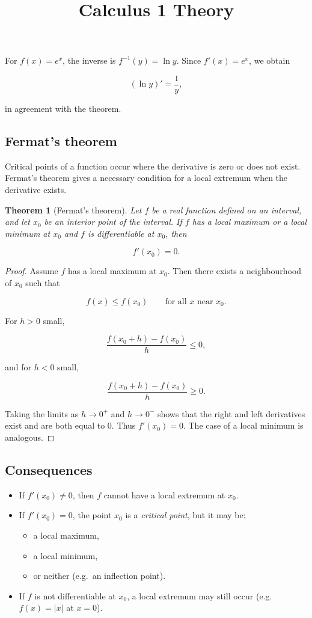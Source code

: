\documentclass[11pt,a4paper]{article} \usepackage[T1]{fontenc}
\theoremstyle{plain} \newtheorem{theorem}{Theorem} \title{Calculus 1 Theory}
\begin{document}
For $f(x)=e^x$, the inverse is $f^{-1}(y)=\ln y$. Since $f'(x)=e^x$, we obtain

\[
(\ln y)' = \frac{1}{y},
\]

in agreement with the theorem.

\subsection {Fermat's theorem}

Critical points of a function occur where the derivative is zero or does not
exist. Fermat's theorem gives a necessary condition for a local extremum when
the derivative exists.

\begin{theorem}
[Fermat's theorem] Let $f$ be a real function defined on an interval, and let
$x_0$ be an interior point of the interval. If $f$ has a local maximum or a
local minimum at $x_0$ and $f$ is differentiable at $x_0$, then

\[
f'(x_0) = 0.
\]

\end{theorem}

\begin{proof}
Assume $f$ has a local maximum at $x_0$. Then there exists a neighbourhood of
$x_0$ such that

\[
f(x) \le f(x_0) \qquad \text{for all } x \text{ near } x_0.
\]

For $h>0$ small,

\[
\frac{f(x_0+h)-f(x_0)}{h} \le 0,
\]

and for $h<0$ small,

\[
\frac{f(x_0+h)-f(x_0)}{h} \ge 0.
\]

Taking the limits as $h\to 0^+$ and $h\to 0^-$ shows that the right and left
derivatives exist and are both equal to $0$. Thus $f'(x_0)=0$. The case of a
local minimum is analogous.
\end{proof}

\subsection*{Consequences}

\begin{itemize}
\item If $f'(x_0)\neq 0$, then $f$ cannot have a local extremum at $x_0$.
\item If $f'(x_0)=0$, the point $x_0$ is a \emph{critical point}, but it may
be:

\begin{itemize}
\item a local maximum,
\item a local minimum,
\item or neither (e.g.\ an inflection point).
\end{itemize}

\item If $f$ is not differentiable at $x_0$, a local extremum may still occur
(e.g.\ $f(x)=|x|$ at $x=0$).
\end{itemize}
\end{document}
